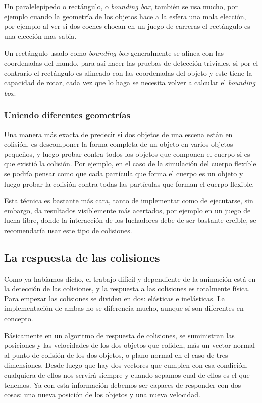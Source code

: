 Un paralelepípedo o rectángulo, o \foreignlanguage{english}{\emph{bounding box}}, también se usa mucho, por ejemplo cuando la geometría de los objetos hace a la esfera una mala elección, por ejemplo al ver si dos coches chocan en un juego de carreras el rectángulo es una elección mas sabia.

Un rectángulo usado como \foreignlanguage{english}{\emph{bounding box}} generalmente se alinea con las coordenadas del mundo, para así hacer las pruebas de detección triviales, si  por el contrario el rectángulo es alineado con las coordenadas del objeto y este tiene la capacidad de rotar, cada vez que lo haga se necesita volver a calcular el  \foreignlanguage{english}{\emph{bounding box}}.
\subsubsection{Uniendo diferentes geometrías}
Una manera más exacta de predecir si dos objetos de una escena están en colisión, es descomponer la forma completa de un objeto en varios objetos pequeños, y luego probar contra todos los objetos que componen el cuerpo si es que existió la colisión. Por ejemplo, en el caso de la simulación del cuerpo flexible se podría pensar como que cada partícula que forma el cuerpo es un objeto y luego probar la colisión contra todas las partículas que forman el cuerpo flexible.

Esta técnica es bastante más cara, tanto de implementar como de ejecutarse, sin embargo, da resultados visiblemente más acertados, por ejemplo en un juego de lucha libre, donde la interacción de los luchadores debe de ser bastante creíble, se recomendaría usar este tipo de colisiones.

\subsection{La respuesta de las colisiones}

Como ya habíamos dicho, el trabajo difícil y dependiente de la animación está en la detección de las colisiones, y la respuesta a las colisiones es totalmente física. Para empezar las colisiones se dividen en dos: elásticas e inelásticas. La implementación de ambas no se diferencia mucho, aunque sí son diferentes en concepto.

Básicamente en un algoritmo de respuesta de colisiones, se suministran las posiciones y las velocidades de los dos objetos que coliden, más un vector normal al punto de colisión de los dos objetos, o plano normal en el caso de tres dimensiones. Desde luego que hay dos vectores que cumplen con esa condición, cualquiera de ellos nos servirá siempre y cuando sepamos cual de ellos es el que tenemos. Ya con esta información debemos ser capaces de responder con dos cosas: una nueva posición de los objetos y una nueva velocidad.

